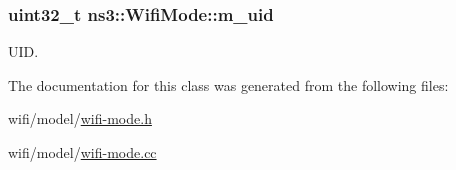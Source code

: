 \subsubsection[{\texorpdfstring{m\+\_\+uid}{m_uid}}]{\setlength{\rightskip}{0pt plus 5cm}uint32\+\_\+t ns3\+::\+Wifi\+Mode\+::m\+\_\+uid\hspace{0.3cm}{\ttfamily [private]}}\hypertarget{classns3_1_1WifiMode_ad63e4633ba59d019abfb07de0858727f}{}\label{classns3_1_1WifiMode_ad63e4633ba59d019abfb07de0858727f}


U\+ID. 



The documentation for this class was generated from the following files\+:\begin{DoxyCompactItemize}
\item 
wifi/model/\hyperlink{wifi-mode_8h}{wifi-\/mode.\+h}\item 
wifi/model/\hyperlink{wifi-mode_8cc}{wifi-\/mode.\+cc}\end{DoxyCompactItemize}
